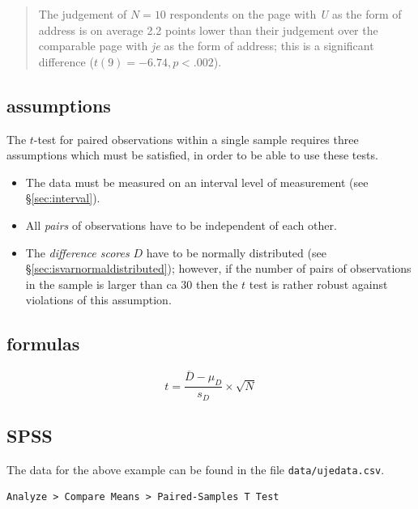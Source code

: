\documentclass[
]{book}
\begin{document}
\begin{quote}
The judgement of \(N=10\) respondents on the page with \emph{U} as the
form of address is on average 2.2 points lower than their judgement
over the comparable page with \emph{je} as the form of address; this is
a significant difference (\(t(9)=-6.74, p<.002\)).
\end{quote}

\subsection{assumptions}\label{assumptions-1}

The \(t\)-test for paired observations within a single sample requires three
assumptions which must be satisfied, in order to be able to use these
tests.

\begin{itemize}
\item
  The data must be measured on an interval level of measurement (see
  §\ref{sec:interval}).
\item
  All \emph{pairs} of observations have to be independent of
  each other.
\item
  The \emph{difference scores} \(D\) have to be normally distributed (see §\ref{sec:isvarnormaldistributed}); however, if the number of pairs of
  observations in the sample is larger than ca 30 then the \(t\) test is rather robust against violations of this assumption.
\end{itemize}

\subsection{formulas}\label{sec:formulas13-4}

\begin{equation}
  \label{eq:t-pairedsamples}
  t = \frac{ \overline{D}-\mu_D} { s_D } \times \sqrt{N}
\end{equation}

\subsection{SPSS}\label{sec:SPSS-ttest-paired}

The data for the above example can be found in the file \texttt{data/ujedata.csv}.

\begin{verbatim}
Analyze > Compare Means > Paired-Samples T Test
\end{verbatim}
\end{document}
